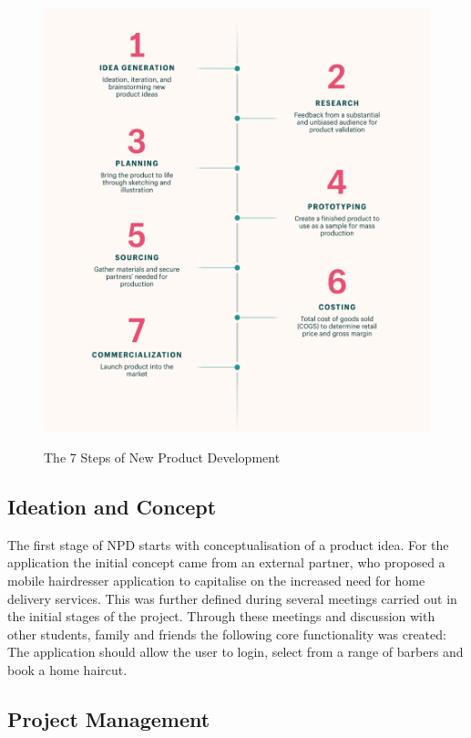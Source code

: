 \documentclass[12pt]{article}
\begin{document}
	\begin{figure}[H]
		\centering
		\includegraphics[scale=0.15]{images/npd.png}
		\caption{The 7 Steps of New Product Development}
		\label{fig:npd} \cite{shopify}
	\end{figure}
	
	
	\subsection{Ideation and Concept}
	The first stage of NPD starts with conceptualisation of a product idea. For the application the initial concept came from an external partner, who proposed a mobile hairdresser application to capitalise on the increased need for home delivery services. This was further defined during several meetings carried out in the initial stages of the project. Through these meetings and discussion with other students, family and friends the following core functionality was created:
	\\
	The application should allow the user to login, select from a range of barbers and book a home haircut.
	
	\subsection{Project Management}
\end{document}
